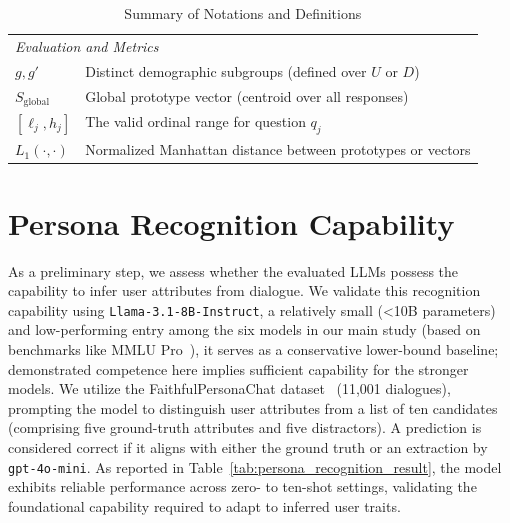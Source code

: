 \documentclass[11pt,a4paper]{article}
\begin{document}
\begin{table}
\begin{tabularx}{\columnwidth}{@{}lX@{}}
    \midrule
    \multicolumn{2}{l}{\textit{Evaluation and Metrics}} \\
    $g, g'$ & Distinct demographic subgroups (defined over $U$ or $D$) \\
    $S_{\text{global}}$ & Global prototype vector (centroid over all responses) \\
    $[\ell_j, h_j]$ & The valid ordinal range for question $q_j$ \\
    $L_1(\cdot, \cdot)$ & Normalized Manhattan distance between prototypes or vectors \\
    \bottomrule
    \end{tabularx}
    \caption{Summary of Notations and Definitions}
    \label{tab:notation}
\end{table}

\section{Persona Recognition Capability}
\label{appendix:persona_recognition}

As a preliminary step, we assess whether the evaluated LLMs possess the capability to infer user attributes from dialogue. We validate this recognition capability using \texttt{Llama-3.1-8B-Instruct}, a relatively small (<10B parameters) and low-performing entry among the six models in our main study (based on benchmarks like MMLU Pro~\cite{mmlupro}), it serves as a conservative lower-bound baseline; demonstrated competence here implies sufficient capability for the stronger models. We utilize the FaithfulPersonaChat dataset~\cite{faithfulPersonaChat} (11,001 dialogues), prompting the model to distinguish user attributes from a list of ten candidates (comprising five ground-truth attributes and five distractors). A prediction is considered correct if it aligns with either the ground truth or an extraction by \texttt{gpt-4o-mini}. As reported in Table~\ref{tab:persona_recognition_result}, the model exhibits reliable performance across zero- to ten-shot settings, validating the foundational capability required to adapt to inferred user traits.
\end{document}
